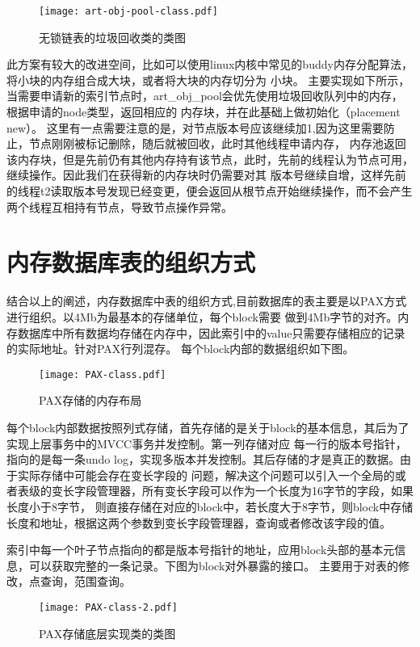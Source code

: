 \begin{figure}[h]
  \centering
  \texttt{[image: art-obj-pool-class.pdf]}
  \caption{无锁链表的垃圾回收类的类图}
  \label{fig:art-obj-pool-class}
\end{figure}

此方案有较大的改进空间，比如可以使用linux内核中常见的buddy内存分配算法，将小块的内存组合成大块，或者将大块的内存切分为
小块。
主要实现如下所示，当需要申请新的索引节点时，art\_obj\_pool会优先使用垃圾回收队列中的内存，根据申请的node类型，返回相应的
内存块，并在此基础上做初始化（placement new）。
这里有一点需要注意的是，对节点版本号应该继续加1,因为这里需要防止，节点刚刚被标记删除，随后就被回收，此时其他线程申请内存，
内存池返回该内存块，但是先前仍有其他内存持有该节点，此时，先前的线程认为节点可用，继续操作。因此我们在获得新的内存块时仍需要对其
版本号继续自增，这样先前的线程t2读取版本号发现已经变更，便会返回从根节点开始继续操作，而不会产生两个线程互相持有节点，导致节点操作异常。


\section{内存数据库表的组织方式}
结合以上的阐述，内存数据库中表的组织方式,目前数据库的表主要是以PAX方式进行组织。以4Mb为最基本的存储单位，每个block需要
做到4Mb字节的对齐。内存数据库中所有数据均存储在内存中，因此索引中的value只需要存储相应的记录的实际地址。针对PAX行列混存。
每个block内部的数据组织如下图。

\begin{figure}[h]
  \centering
  \texttt{[image: PAX-class.pdf]}
  \caption{PAX存储的内存布局}
  \label{fig:PAX-class}
\end{figure}

每个block内部数据按照列式存储，首先存储的是关于block的基本信息，其后为了实现上层事务中的MVCC事务并发控制。第一列存储对应
每一行的版本号指针，指向的是每一条undo log，实现多版本并发控制。其后存储的才是真正的数据。由于实际存储中可能会存在变长字段的
问题，解决这个问题可以引入一个全局的或者表级的变长字段管理器，所有变长字段可以作为一个长度为16字节的字段，如果长度小于8字节，
则直接存储在对应的block中，若长度大于8字节，则block中存储长度和地址，根据这两个参数到变长字段管理器，查询或者修改该字段的值。

索引中每一个叶子节点指向的都是版本号指针的地址，应用block头部的基本元信息，可以获取完整的一条记录。下图为block对外暴露的接口。
主要用于对表的修改，点查询，范围查询。

\begin{figure}[h]
  \centering
  \texttt{[image: PAX-class-2.pdf]}
  \caption{PAX存储底层实现类的类图}
  \label{fig:PAX-class-2}
\end{figure}

